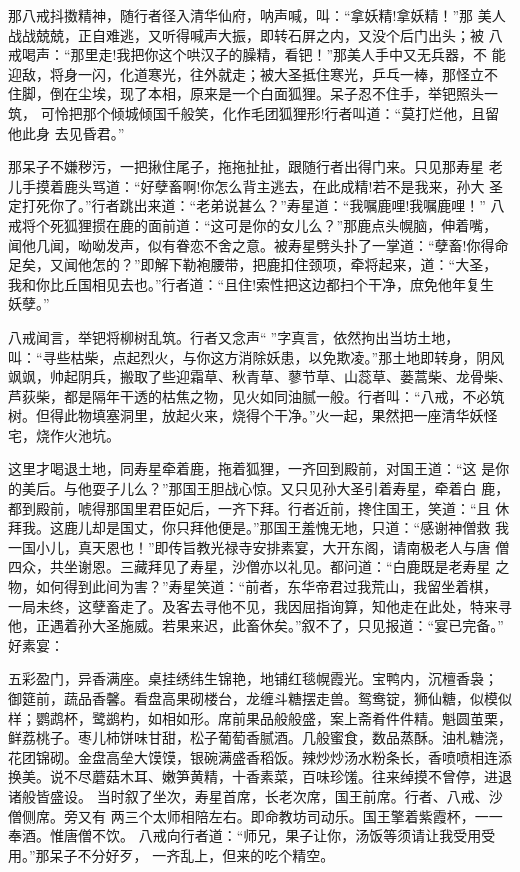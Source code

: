 那八戒抖擞精神，随行者径入清华仙府，呐声喊，叫：“拿妖精!拿妖精！”那
美人战战兢兢，正自难逃，又听得喊声大振，即转石屏之内，又没个后门出头；被
八戒喝声：“那里走!我把你这个哄汉子的臊精，看钯！”那美人手中又无兵器，不
能迎敌，将身一闪，化道寒光，往外就走；被大圣抵住寒光，乒乓一棒，那怪立不
住脚，倒在尘埃，现了本相，原来是一个白面狐狸。呆子忍不住手，举钯照头一筑，
可怜把那个倾城倾国千般笑，化作毛团狐狸形!行者叫道：“莫打烂他，且留他此身
去见昏君。”

那呆子不嫌秽污，一把揪住尾子，拖拖扯扯，跟随行者出得门来。只见那寿星
老儿手摸着鹿头骂道：“好孽畜啊!你怎么背主逃去，在此成精!若不是我来，孙大
圣定打死你了。”行者跳出来道：“老弟说甚么？”寿星道：“我嘱鹿哩!我嘱鹿哩！”
八戒将个死狐狸掼在鹿的面前道：“这可是你的女儿么？”那鹿点头幌脑，伸着嘴，
闻他几闻，呦呦发声，似有眷恋不舍之意。被寿星劈头扑了一掌道：“孽畜!你得命
足矣，又闻他怎的？”即解下勒袍腰带，把鹿扣住颈项，牵将起来，道：“大圣，
我和你比丘国相见去也。”行者道：“且住!索性把这边都扫个干净，庶免他年复生
妖孽。”

八戒闻言，举钯将柳树乱筑。行者又念声“”字真言，依然拘出当坊土地，
叫：“寻些枯柴，点起烈火，与你这方消除妖患，以免欺凌。”那土地即转身，阴风
飒飒，帅起阴兵，搬取了些迎霜草、秋青草、蓼节草、山蕊草、蒌蒿柴、龙骨柴、
芦荻柴，都是隔年干透的枯焦之物，见火如同油腻一般。行者叫：“八戒，不必筑
树。但得此物填塞洞里，放起火来，烧得个干净。”火一起，果然把一座清华妖怪
宅，烧作火池坑。

这里才喝退土地，同寿星牵着鹿，拖着狐狸，一齐回到殿前，对国王道：“这
是你的美后。与他耍子儿么？”那国王胆战心惊。又只见孙大圣引着寿星，牵着白
鹿，都到殿前，唬得那国里君臣妃后，一齐下拜。行者近前，搀住国王，笑道：“且
休拜我。这鹿儿却是国丈，你只拜他便是。”那国王羞愧无地，只道：“感谢神僧救
我一国小儿，真天恩也！”即传旨教光禄寺安排素宴，大开东阁，请南极老人与唐
僧四众，共坐谢恩。三藏拜见了寿星，沙僧亦以礼见。都问道：“白鹿既是老寿星
之物，如何得到此间为害？”寿星笑道：“前者，东华帝君过我荒山，我留坐着棋，
一局未终，这孽畜走了。及客去寻他不见，我因屈指询算，知他走在此处，特来寻
他，正遇着孙大圣施威。若果来迟，此畜休矣。”叙不了，只见报道：“宴已完备。”
好素宴：

五彩盈门，异香满座。桌挂绣纬生锦艳，地铺红毯幌霞光。宝鸭内，沉檀香袅；
御筵前，蔬品香馨。看盘高果砌楼台，龙缠斗糖摆走兽。鸳鸯锭，狮仙糖，似模似
样；鹦鹉杯，鹭鹚杓，如相如形。席前果品般般盛，案上斋肴件件精。魁圆茧栗，
鲜荔桃子。枣儿柿饼味甘甜，松子葡萄香腻酒。几般蜜食，数品蒸酥。油札糖浇，
花团锦砌。金盘高垒大馍馍，银碗满盛香稻饭。辣炒炒汤水粉条长，香喷喷相连添
换美。说不尽蘑菇木耳、嫩笋黄精，十香素菜，百味珍馐。往来绰摸不曾停，进退
诸般皆盛设。
当时叙了坐次，寿星首席，长老次席，国王前席。行者、八戒、沙僧侧席。旁又有
两三个太师相陪左右。即命教坊司动乐。国王擎着紫霞杯，一一奉酒。惟唐僧不饮。
八戒向行者道：“师兄，果子让你，汤饭等须请让我受用受用。”那呆子不分好歹，
一齐乱上，但来的吃个精空。

